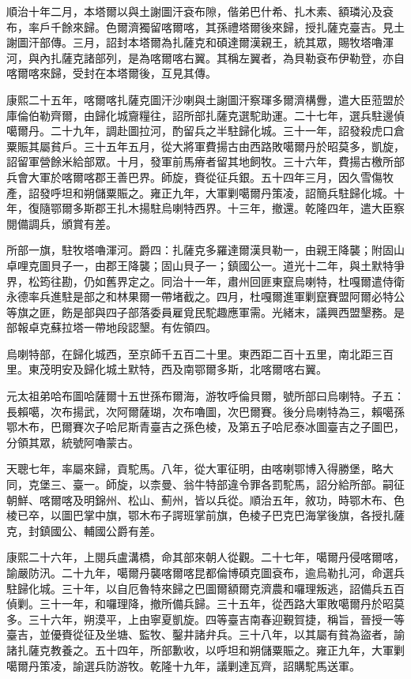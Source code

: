 \begin{pinyinscope}
順治十年二月，本塔爾以與土謝圖汗袞布隙，偕弟巴什希、扎木素、額璘沁及袞布，率戶千餘來歸。色爾濟獨留喀爾喀，其孫禮塔爾後來歸，授扎薩克臺吉。見土謝圖汗部傳。三月，詔封本塔爾為扎薩克和碩達爾漢親王，統其眾，賜牧塔嚕渾河，與內扎薩克諸部列，是為喀爾喀右翼。其稱左翼者，為貝勒袞布伊勒登，亦自喀爾喀來歸，受封在本塔爾後，互見其傳。

康熙二十五年，喀爾喀扎薩克圖汗沙喇與土謝圖汗察琿多爾濟構釁，遣大臣蒞盟於庫倫伯勒齊爾，由歸化城齎糧往，詔所部扎薩克選駝助運。二十七年，選兵駐邊偵噶爾丹。二十九年，調赴圖拉河，酌留兵之半駐歸化城。三十一年，詔發殺虎口倉粟賑其屬貧戶。三十五年五月，從大將軍費揚古由西路敗噶爾丹於昭莫多，凱旋，詔留軍營餘米給部眾。十月，發軍前馬瘠者留其地飼牧。三十六年，費揚古檄所部兵會大軍於喀爾喀郡王善巴界。師旋，賚從征兵銀。五十四年三月，因久雪傷牧產，詔發呼坦和朔儲粟賑之。雍正九年，大軍剿噶爾丹策凌，詔簡兵駐歸化城。十年，復隨鄂爾多斯郡王扎木揚駐烏喇特西界。十三年，撤還。乾隆四年，遣大臣察閱備調兵，頒賞有差。

所部一旗，駐牧塔嚕渾河。爵四：扎薩克多羅達爾漢貝勒一，由親王降襲；附固山卓哩克圖貝子一，由郡王降襲；固山貝子一；鎮國公一。道光十二年，與土默特爭界，松筠往勘，仍如舊界定之。同治十一年，肅州回匪東竄烏喇特，杜嘎爾遣侍衛永德率兵進駐是部之和林果爾一帶堵截之。四月，杜嘎爾進軍剿竄賽盟阿爾必特公等旗之匪，飭是部與四子部落委員雇覓民駝趣應軍需。光緒末，議興西盟墾務。是部報卓克蘇拉塔一帶地段認墾。有佐領四。

烏喇特部，在歸化城西，至京師千五百二十里。東西距二百十五里，南北距三百里。東茂明安及歸化城土默特，西及南鄂爾多斯，北喀爾喀右翼。

元太祖弟哈布圖哈薩爾十五世孫布爾海，游牧呼倫貝爾，號所部曰烏喇特。子五：長賴噶，次布揚武，次阿爾薩瑚，次布嚕圖，次巴爾賽。後分烏喇特為三，賴噶孫鄂木布，巴爾賽次子哈尼斯青臺吉之孫色棱，及第五子哈尼泰冰圖臺吉之子圖巴，分領其眾，統號阿嚕蒙古。

天聰七年，率屬來歸，貢駝馬。八年，從大軍征明，由喀喇鄂博入得勝堡，略大同，克堡三、臺一。師旋，以柰曼、翁牛特部違令罪各罰駝馬，詔分給所部。嗣征朝鮮、喀爾喀及明錦州、松山、薊州，皆以兵從。順治五年，敘功，時鄂木布、色棱已卒，以圖巴掌中旗，鄂木布子諤班掌前旗，色棱子巴克巴海掌後旗，各授扎薩克，封鎮國公、輔國公爵有差。

康熙二十六年，上閱兵盧溝橋，命其部來朝人從觀。二十七年，噶爾丹侵喀爾喀，諭嚴防汛。二十九年，噶爾丹襲喀爾喀昆都倫博碩克圖袞布，逾烏勒扎河，命選兵駐歸化城。三十年，以自厄魯特來歸之巴圖爾額爾克濟農和囉理叛逃，詔備兵五百偵剿。三十一年，和囉理降，撤所備兵歸。三十五年，從西路大軍敗噶爾丹於昭莫多。三十六年，朔漠平，上由寧夏凱旋。四等臺吉南春迎覲賀捷，稱旨，晉授一等臺吉，並優賚從征及坐塘、監牧、鑿井諸弁兵。三十八年，以其屬有貧為盜者，諭諸扎薩克教養之。五十四年，所部歉收，以呼坦和朔儲粟賑之。雍正九年，大軍剿噶爾丹策凌，諭選兵防游牧。乾隆十九年，議剿達瓦齊，詔購駝馬送軍。


\end{pinyinscope}
